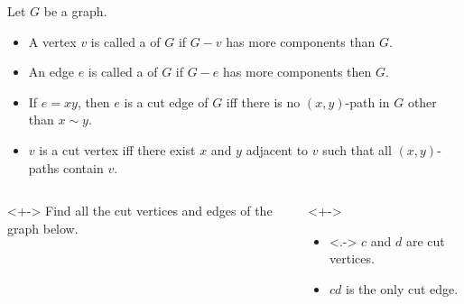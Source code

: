 \documentclass
[ignorenonframetext,14pt,aspectratio=169]
{ngelessonslides}
\begin{document}
\begin{frame}[label=cut-def]
    \begin{definition}
        Let $G$ be a graph.
        \begin{itemize}
            \item A vertex $v$ is called a  of $G$ if $G-v$ has more components than $G$.
            \item An edge $e$ is called a  of $G$ if $G-e$ has more components then $G$.
        \end{itemize}
    \end{definition}
    \begin{itemize}
        \item If $e=xy$, then $e$ is a cut edge of $G$ iff
              there is no $(x,y)$-path in $G$ other than $x \sim y$.
        \item $v$ is a cut vertex iff there exist $x$ and $y$ adjacent to $v$
              such that all $(x,y)$-paths contain $v$.
    \end{itemize}
\end{frame}

\begin{frame}[label=cut-ex]
    \begin{columns}
    \begin{column}{0.45\textwidth}
        \begin{example}<+->
            Find all the cut vertices and edges of the graph
            below.
            \begin{center}
            \end{center}
        \end{example}
    \end{column}
    \begin{column}{0.45\textwidth}
        \begin{solution}<+->
            \begin{itemize}
                \item<.-> $c$ and $d$ are cut vertices.
                \item<+-> $cd$ is the only cut edge.
            \end{itemize}
        \end{solution}
    \end{column}
    \end{columns}
\end{frame}
\end{document}
